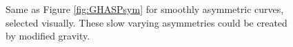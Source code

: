 \documentclass{emulateapj}
\begin{document}
\begin{figure}
\caption{Same as Figure \ref{fig:GHASPsym} for smoothly asymmetric curves, 
selected visually. These slow varying asymmetries could be created by modified
gravity.  
\label{fig:GHASPasym}}
\end{figure}
\end{document}
